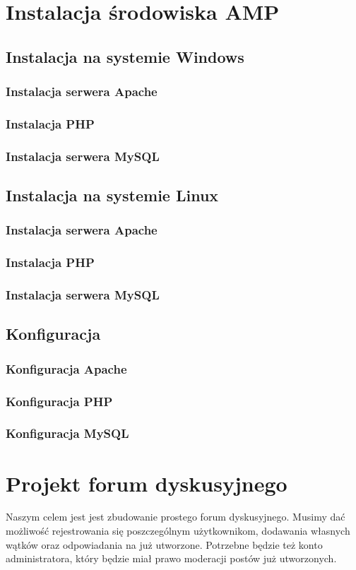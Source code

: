 \documentclass[a4paper,10pt]{article}
\begin{document}
\section{Instalacja środowiska AMP}
\subsection{Instalacja na systemie Windows}
\subsubsection{Instalacja serwera Apache}
\subsubsection{Instalacja PHP}
\subsubsection{Instalacja serwera MySQL}
\subsection{Instalacja na systemie Linux}
\subsubsection{Instalacja serwera Apache}
\subsubsection{Instalacja PHP}
\subsubsection{Instalacja serwera MySQL}
\subsection{Konfiguracja}
\subsubsection{Konfiguracja Apache}
\subsubsection{Konfiguracja PHP}
\subsubsection{Konfiguracja MySQL}
\section{Projekt forum dyskusyjnego}
Naszym celem jest jest zbudowanie prostego forum dyskusyjnego. Musimy dać możliwość rejestrowania się poszczególnym użytkownikom, dodawania własnych wątków oraz odpowiadania na już utworzone. Potrzebne będzie też konto administratora, który będzie miał prawo moderacji postów już utworzonych.
\end{document}
